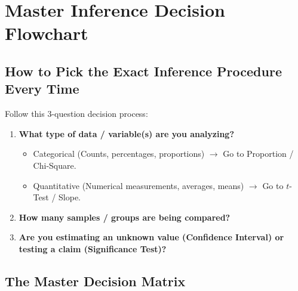 \chapter{Master Inference Decision Flowchart}

\section{How to Pick the Exact Inference Procedure Every Time}

Follow this 3-question decision process:

\begin{enumerate}[label=\textbf{Step \arabic*:}]
    \item \textbf{What type of data / variable(s) are you analyzing?}
    \begin{itemize}
        \item Categorical (Counts, percentages, proportions) $\to$ Go to Proportion / Chi-Square.
        \item Quantitative (Numerical measurements, averages, means) $\to$ Go to $t$-Test / Slope.
    \end{itemize}
    \item \textbf{How many samples / groups are being compared?}
    \item \textbf{Are you estimating an unknown value (Confidence Interval) or testing a claim (Significance Test)?}
\end{enumerate}

\section{The Master Decision Matrix}

